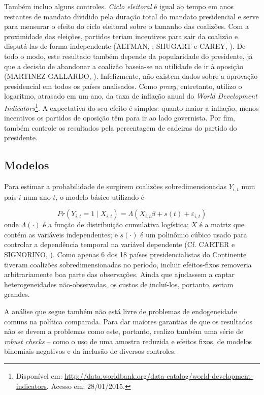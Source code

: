 Também incluo alguns controles. \textit{Ciclo eleitoral} é igual ao tempo em anos restantes de mandato dividido pela duração total do mandato presidencial e serve para mensurar o efeito do ciclo eleitoral sobre o tamanho das coalizões. Com a proximidade das eleições, partidos teriam incentivos para sair da coalizão e disputá-las de forma independente (ALTMAN, \citeyear{altman2000}; SHUGART e CAREY, \citeyear{shugart1992}). De todo o modo, este resultado também depende da popularidade do presidente, já que a decisão de abandonar a coalizão baseia-se na utilidade de ir à oposição (MARTINEZ-GALLARDO, \citeyear{martinez2012}). Infelizmente, não existem dados sobre a aprovação presidencial em todos os países analisados. Como \textit{proxy}, entretanto, utilizo o logaritmo, atrasado em um ano, da taxa de inflação anual do \textit{World Development Indicators}\footnote{Disponível em: \url{http://data.worldbank.org/data-catalog/world-development-indicators}. Acesso em: 28/01/2015.}. A expectativa do seu efeito é simples: quanto maior a inflação, menos incentivos os partidos de oposição têm para ir ao lado governista. Por fim, também controle os resultados pela percentagem de cadeiras do partido do presidente.

\subsection{Modelos}

Para estimar a probabilidade de surgirem coalizões sobredimensionadas $Y_{i, t}$ num país $i$ num ano $t$, o modelo básico utilizado é

\begin{equation}
Pr(Y_{i, t} = 1 \mid X_{i, t}) = \Lambda(X_{i, t}\beta + s(t) + \varepsilon_{i, t})
\end{equation}
\noindent
onde $\Lambda(\cdot)$ é a função de distribuição cumulativa logística; $X$ é a matriz que contém as variáveis independentes; e $s(\cdot)$ é um polinômio cúbico usado para controlar a dependência temporal na variável dependente (Cf. CARTER e SIGNORINO, \citeyear{carter2010}). Como apenas 6 dos 18 países presidencialistas do Continente tiveram coalizões sobredimensionadas no período, incluir efeitos-fixos removeria arbitrariamente boa parte das observações. Ainda que ajudassem a captar heterogeneidades não-observadas, os custos de incluí-los, portanto, seriam grandes. 
 
A análise que segue também não está livre de problemas de endogeneidade comuns na política comparada. Para dar maiores garantias de que os resultados não se devem a problemas como este, portanto, realizo também uma série de \textit{robust checks} -- como o uso de uma amostra reduzida e efeitos fixos, de modelos binomiais negativos e da inclusão de diversos controles.